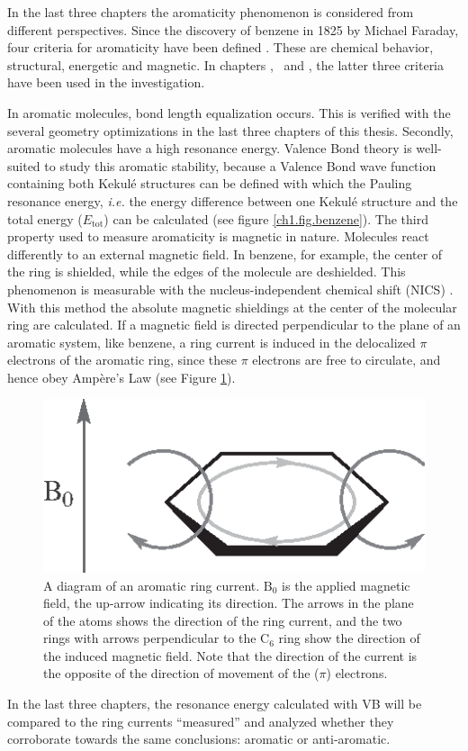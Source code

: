 In the last three chapters the aromaticity phenomenon is considered from different perspectives. Since the discovery of benzene in 1825 by Michael Faraday, four criteria for aromaticity have been defined \cite{aromaticity}. These are chemical behavior, structural, energetic and magnetic. In chapters \chhuckel, \chinorganic\ and \chindacene, the latter three criteria have been used in the investigation. 

In aromatic molecules, bond length equalization occurs. This is verified with the several geometry optimizations in the last three chapters of this thesis. Secondly, aromatic molecules have a high resonance energy. Valence Bond theory is well-suited to study this aromatic stability, because a Valence Bond wave function containing both Kekul\'{e} structures can be defined with which the Pauling resonance energy, \textit{i.e.} the energy difference between one Kekul\'e structure and the total energy ($E_\mathrm{tot}$) can be calculated \cite{pauling5} (see figure \ref{ch1.fig.benzene}). The third property used to measure aromaticity is magnetic in nature. Molecules react differently to an external magnetic field. In benzene, for example, the center of the ring is shielded, while the edges of the molecule are deshielded. This phenomenon is measurable with the nucleus-independent chemical shift (NICS) \cite{schleyer}. With this method the absolute magnetic shieldings at the center of the molecular ring are calculated. If a magnetic field is directed perpendicular to the plane of an aromatic system, like benzene, a ring current is induced in the delocalized $\pi$ electrons of the aromatic ring, since these $\pi$ electrons are free to circulate, and hence obey Amp\`{e}re's Law (see Figure \ref{ch1.fig.ringcurrent}).
\begin{figure}[htp]
\center
\includegraphics{introduction/figures/ringcurrent.eps}
\caption{A diagram of an aromatic ring current. $\mathrm{B_0}$ is the applied magnetic field, the up-arrow indicating its direction. The arrows in the plane of the atoms shows the direction of the ring current, and the two rings with arrows perpendicular to the C$_6$ ring show the direction of the induced magnetic field. Note that the direction of the current is the opposite of the direction of movement of the ($\pi$) electrons.}
\label{ch1.fig.ringcurrent}
\end{figure}
In the last three chapters, the resonance energy calculated with VB will be compared to the ring currents ``measured'' and analyzed whether they corroborate towards the same conclusions: aromatic or anti-aromatic.

